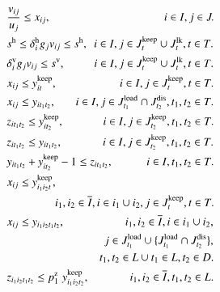 \documentclass[a4j,11pt,twocolumn]{jsarticle}
\begin{document}
\newpage

\begin{align}
&\frac{v_{ij}} {u_j} \leq x_{ij}, \hspace{10em} i \in I, j \in J. \\
&s^{\rm{h}} \leq {\delta_{i}^{\rm{h}}}{g_{j}} {v_{ij}} \leq s^{\rm{h}}, \hspace{0.5em} i \in I, j \in J_{t}^{\rm{keep}} \cup J_{t}^{\rm{lk}}, t \in T. \\
&{\delta_{i}^{\rm{v}}}{g_{j}} {v_{ij}} \leq s^{\rm{v}}, \hspace{2.55em} i \in I, j \in J_{t}^{\rm{keep}} \cup J_{t}^{\rm{lk}}, t \in T.  \\
&{x_{ij}} \leq {y_{it}^{\rm{keep}}}, \hspace{5.5em} i \in I, j \in J_{t}^{\rm{keep}}, t \in T. \\
&{x_{ij}} \leq {y_{it_1t_2}}, \hspace{1.75em} i \in I, j \in J_{t_1}^{\rm{load}} \cap J_{t_2}^{\rm{dis}}, {t_1},{t_2} \in T. \\
&{z_{it_1t_2}} \leq {y_{it_2}^{\rm{keep}}} ,  \hspace{3.45em} i \in I, j \in J_{t_2}^{\rm{keep}}, t_1,t_2 \in T. \\
&{z_{it_1t_2}} \leq {y_{it_1t_2}} ,  \hspace{3.55em} i \in I, j \in J_{t_2}^{\rm{keep}}, t_1,t_2 \in T. \\
&{y_{it_1t_2}} + y_{it_2}^{\rm{keep}} - 1 \leq {z_{it_1t_2}}, \hspace{2.95em} i \in I, t_1,t_2 \in T. \\
&{x_{ij}} \leq {y_{i_1i_2t}^{\rm{keep}}},  \notag \\
&\hspace{4.25em} i_1, i_2 \in \overline{I}, i \in i_1 \cup i_2, j \in J_{t}^{\rm{keep}}, t \in T. \\
&{x_{ij}} \leq {y_{i_1i_2t_1t_2}}, \hspace{5.33em} i_1, i_2 \in \overline{I}, i \in i_1 \cup i_2, \notag \\
&\hspace{8.59em} j \in J_{t_1}^{\rm{load}} \cup \{J_{t_1}^{\rm{load}} \cap J_{t_2}^{\rm{dis}} \}, \notag \\
&\hspace{8.17em} {t_1},{t_2} \in L \cup {t_1} \in L , {t_2} \in D. \\
&{z_{i_1i_2t_1t_2}} \leq p_1^{\rm{z}} \hspace{0.3em} {y_{i_1i_2t_2}^{\rm{keep}}}, \hspace{3.58em} i_1, i_2 \in \overline{I}, {t_1},{t_2} \in L. \\

\end{align}
\end{document}
